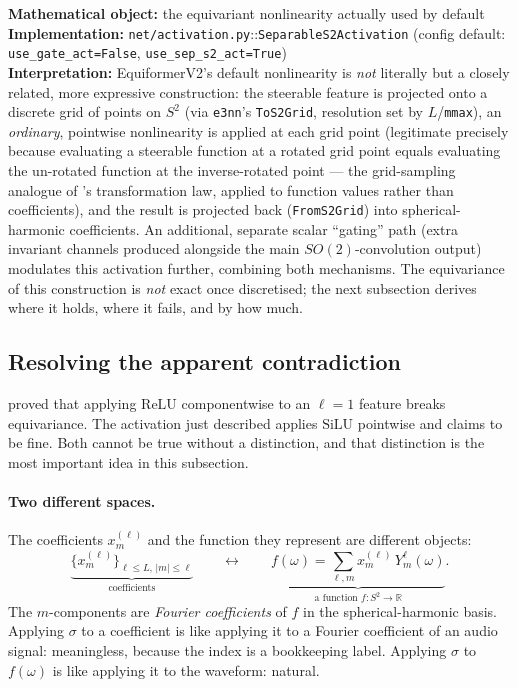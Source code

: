 \documentclass[11pt,a4paper]{report}
\theoremstyle{definition}
\theoremstyle{remark}
\newcommand{\RR}{\mathbb R}
\newcommand{\file}[1]{\texttt{#1}}
\newcommand{\pyfunc}[1]{\texttt{#1}}
\begin{document}
\begin{codebox}
\textbf{Mathematical object:} the equivariant nonlinearity actually used by
default \\
\textbf{Implementation:} \file{net/activation.py}::\pyfunc{SeparableS2Activation}
(config default: \texttt{use\_gate\_act=False}, \texttt{use\_sep\_s2\_act=True}) \\
\textbf{Interpretation:} EquiformerV2's default nonlinearity is \emph{not}
literally  but a closely related, more expressive
construction: the steerable feature is projected onto a discrete grid of
points on $S^2$ (via \texttt{e3nn}'s \pyfunc{ToS2Grid}, resolution set by
$L$/\texttt{mmax}), an \emph{ordinary}, pointwise nonlinearity is applied at
each grid point (legitimate precisely because evaluating a steerable
function at a rotated grid point equals evaluating the un-rotated function
at the inverse-rotated point --- the grid-sampling analogue of
's transformation law, applied to function values
rather than coefficients), and the result is projected back
(\pyfunc{FromS2Grid}) into spherical-harmonic coefficients. An additional,
separate scalar ``gating'' path (extra invariant channels produced
alongside the main $SO(2)$-convolution output) modulates this activation
further, combining both mechanisms. The equivariance of this construction is
\emph{not} exact once discretised; the next subsection derives where it
holds, where it fails, and by how much.
\end{codebox}

\subsection{Resolving the apparent contradiction}
\label{sec:s2-activation-resolved}

 proved that applying $\mathrm{ReLU}$
componentwise to an $\ell=1$ feature breaks equivariance. The activation just
described applies $\mathrm{SiLU}$ pointwise and claims to be fine. Both
cannot be true without a distinction, and that distinction is the most
important idea in this subsection.

\paragraph{Two different spaces.} The coefficients $x^{(\ell)}_m$ and the
function they represent are different objects:
\[
\underbrace{\bigl\{x^{(\ell)}_m\bigr\}_{\ell\le L,\,|m|\le\ell}}_{\text{coefficients}}
\qquad\longleftrightarrow\qquad
\underbrace{f(\omega)=\sum_{\ell,m}x^{(\ell)}_m\,Y^\ell_m(\omega)}_{\text{a function } f:S^2\to\RR} .
\]
The $m$-components are \emph{Fourier coefficients} of $f$ in the
spherical-harmonic basis. Applying $\sigma$ to a coefficient is like applying
it to a Fourier coefficient of an audio signal: meaningless, because the
index is a bookkeeping label. Applying $\sigma$ to $f(\omega)$ is like
applying it to the waveform: natural.
\end{document}
